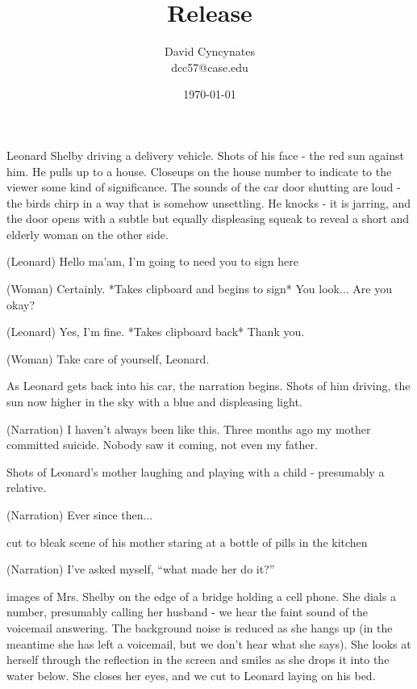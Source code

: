 \documentclass{article}
\title{Release}
\author{David Cyncynates \\ dcc57@case.edu}
\date{\today}
\begin{document}
\maketitle
Leonard Shelby driving a delivery vehicle. Shots of his face - the red sun against him. He pulls up to a house. Closeups on the house number to indicate to the viewer some kind of significance. The sounds of the car door shutting are loud - the birds chirp in a way that is somehow unsettling. He knocks - it is jarring, and the door opens with a subtle but equally displeasing squeak to reveal a short and elderly woman on the other side.
\begin{description}
\item{(Leonard)} Hello ma'am, I'm going to need you to sign here
\item{(Woman)} Certainly. *Takes clipboard and begins to sign* You look... Are you okay?
\item{(Leonard)} Yes, I'm fine. *Takes clipboard back* Thank you.
\item{(Woman)} Take care of yourself, Leonard.
\end{description}
As Leonard gets back into his car, the narration begins. Shots of him driving, the sun now higher in the sky with a blue and displeasing light.
\begin{description}
\item{(Narration)} I haven't always been like this. Three months ago my mother committed suicide. Nobody saw it coming, not even my father.
\end{description}
Shots of Leonard's mother laughing and playing with a child - presumably a relative.
\begin{description}
\item{(Narration)} Ever since then...
\end{description}
cut to bleak scene of his mother staring at a bottle of pills in the kitchen
\begin{description}
\item{(Narration)} I've asked myself, ``what made her do it?''
\end{description}
images of Mrs. Shelby on the edge of a bridge holding a cell phone. She dials a number, presumably calling her husband - we hear the faint sound of the voicemail answering. The background noise is reduced as she hangs up (in the meantime she has left a voicemail, but we don't hear what she says). She looks at herself through the reflection in the screen and smiles as she drops it into the water below. She closes her eyes, and we cut to Leonard laying on his bed.
\end{document}
